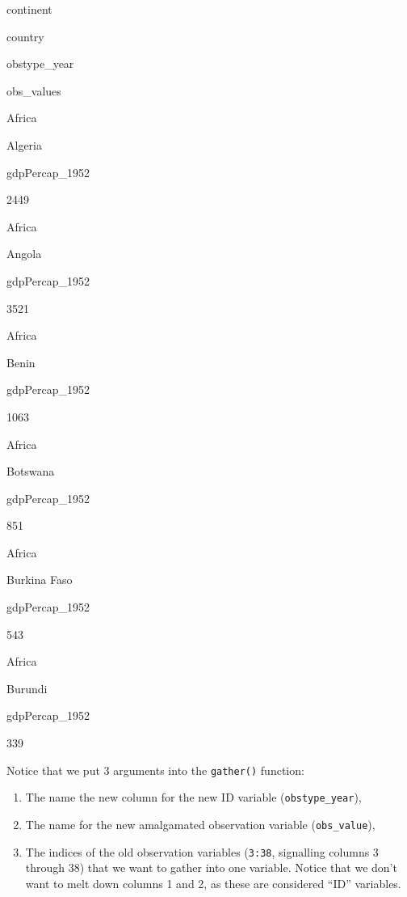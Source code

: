 \documentclass[]{book}
\newenvironment{Shaded}{\begin{snugshade}}{\end{snugshade}}
\newcommand{\DecValTok}[1]{\textcolor[rgb]{0.00,0.00,0.81}{#1}}
\newcommand{\KeywordTok}[1]{\textcolor[rgb]{0.13,0.29,0.53}{\textbf{#1}}}
\newcommand{\NormalTok}[1]{#1}
\newcommand{\OperatorTok}[1]{\textcolor[rgb]{0.81,0.36,0.00}{\textbf{#1}}}
\newcommand{\StringTok}[1]{\textcolor[rgb]{0.31,0.60,0.02}{#1}}
\providecommand{\tightlist}{%
  \setlength{\itemsep}{0pt}\setlength{\parskip}{0pt}}
\begin{document}
\begin{Shaded}
\end{Shaded}

continent

country

obstype\_year

obs\_values

Africa

Algeria

gdpPercap\_1952

2449

Africa

Angola

gdpPercap\_1952

3521

Africa

Benin

gdpPercap\_1952

1063

Africa

Botswana

gdpPercap\_1952

851

Africa

Burkina Faso

gdpPercap\_1952

543

Africa

Burundi

gdpPercap\_1952

339

Notice that we put 3 arguments into the \texttt{gather()} function:

\begin{enumerate}
\def\labelenumi{\arabic{enumi}.}
\tightlist
\item
  The name the new column for the new ID variable (\texttt{obstype\_year}),
\item
  The name for the new amalgamated observation variable (\texttt{obs\_value}),
\item
  The indices of the old observation variables (\texttt{3:38}, signalling columns 3 through 38) that we want to gather into one variable. Notice that we don't want to melt down columns 1 and 2, as these are considered ``ID'' variables.
\end{enumerate}
\end{document}
